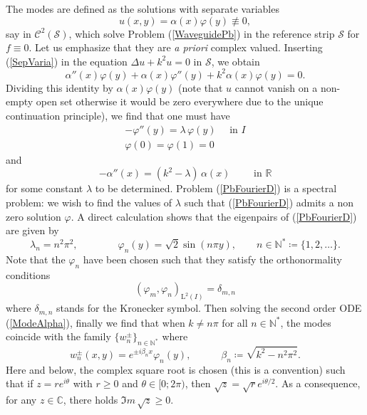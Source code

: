 \documentclass[11pt,a4paper]{report}
\newcommand{\mrm}[1]{\mathrm{#1}}
\newcommand{\Cplx}{\mathbb{C}}
\newcommand{\N}{\mathbb{N}}
\newcommand{\R}{\mathbb{R}}
\newcommand{\mL}{\mrm{L}}
\begin{document}
The modes are defined as the solutions with separate variables 
\begin{equation}\label{SepVaria}
u(x,y)=\alpha(x)\varphi(y)\not\equiv0,
\end{equation}
say in $\mathscr{C}^2(\mathcal{S})$, which solve Problem (\ref{WaveguidePb}) in the reference strip $\mathcal{S}$ for $f\equiv0$. Let us emphasize that they are \textit{a priori} complex valued. Inserting (\ref{SepVaria}) in the equation $\Delta u+k^2u=0$ in $\mathcal{S}$, we obtain
\[
\alpha''(x)\varphi(y)+\alpha(x)\varphi''(y)+k^2\alpha(x)\varphi(y)=0.
\]
Dividing this identity by $\alpha(x)\varphi(y)$ (note that $u$ cannot vanish on a non-empty open set otherwise it would be zero everywhere due to the unique continuation principle), we find that one must have
\begin{equation}\label{PbFourierD}
\begin{array}{|l}
-\varphi''(y)=\lambda\,\varphi(y)\quad\mbox{ in }I\\[3pt]
\varphi(0)=\varphi(1)=0
\end{array}
\end{equation}
and 
\begin{equation}\label{ModeAlpha}
-\alpha''(x)=(k^2-\lambda)\,\alpha(x)\qquad \mbox{ in }\R
\end{equation}
for some constant $\lambda$ to be determined. Problem (\ref{PbFourierD}) is a spectral problem: we wish to find the values of $\lambda$ such that (\ref{PbFourierD}) admits a non zero solution $\varphi$. A direct calculation shows that the eigenpairs of (\ref{PbFourierD}) are given by
\begin{equation}\label{BaseFourierDirichlet}
\lambda_n=n^2\pi^2,\qquad\qquad \varphi_n(y)=\sqrt{2}\sin(n\pi y),\qquad n\in\N^\ast\coloneqq\{1,2,\dots\}.
\end{equation}
Note that the $\varphi_n$ have been chosen such that they satisfy the orthonormality conditions 
\[
(\varphi_m,\varphi_n)_{\mL^2(I)}=\delta_{m,n}
\]
where $\delta_{m,n}$ stands for the Kronecker symbol. Then solving the second order ODE (\ref{ModeAlpha}), finally we find that when $k\ne n\pi$ for all $n\in\N^\ast$, the modes 
coincide with the family $\{w^\pm_n\}_{n\in\N^\ast}$ where 
\begin{equation}\label{DefModes}
w^\pm_n(x,y)=e^{\pm i\beta_n x}\varphi_n(y),\qquad\quad\beta_n\coloneqq\sqrt{k^2-n^2\pi^2}.
\end{equation}
Here and below, the complex square root is chosen (this is a convention) such that if $z=r e^{i\theta}$ with $r\ge0$ and $\theta\in[0;2\pi)$, then $\sqrt{z}=\sqrt{r} e^{i \theta/2}$. As a consequence, for any $z\in\Cplx$, there holds $\Im m\,\sqrt{z}\ge0$.\\
\end{document}
